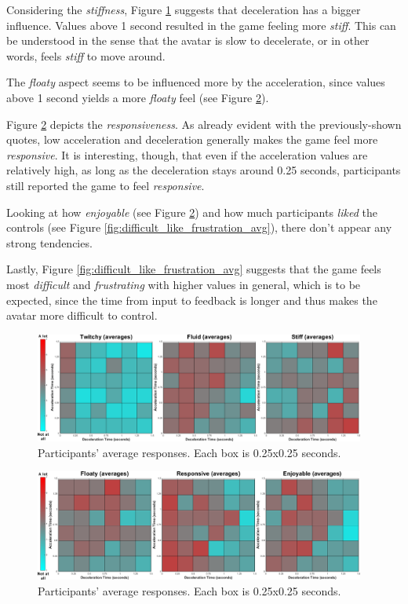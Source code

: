 Considering the \textit{stiffness}, Figure \ref{fig:twitchy_fluid_stiff_avg} suggests that deceleration has a bigger influence. Values above 1 second resulted in the game feeling more \textit{stiff}. This can be understood in the sense that the avatar is slow to decelerate, or in other words, feels \textit{stiff} to move around.

The \textit{floaty} aspect seems to be influenced more by the acceleration, since values above 1 second yields a more \textit{floaty} feel (see Figure \ref{fig:floaty_responsive_enjoyable_avg}).

Figure \ref{fig:floaty_responsive_enjoyable_avg} depicts the \textit{responsiveness}. As already evident with the previously-shown quotes, low acceleration and deceleration generally makes the game feel more \textit{responsive}. It is interesting, though, that even if the acceleration values are relatively high, as long as the deceleration stays around 0.25 seconds, participants still reported the game to feel \textit{responsive}.

Looking at how \textit{enjoyable} (see Figure \ref{fig:floaty_responsive_enjoyable_avg}) and how much participants \textit{liked} the controls (see Figure \ref{fig:difficult_like_frustration_avg}), there don't appear any strong tendencies.

Lastly, Figure \ref{fig:difficult_like_frustration_avg} suggests that the game feels most \textit{difficult} and \textit{frustrating} with higher values in general, which is to be expected, since the time from input to feedback is longer and thus makes the avatar more difficult to control.

\begin{figure}[!htb]
\centering
\includegraphics[width=0.97\textwidth]{Pics/Classes/averages/twitchy_fluid_stiff_avg}
\caption{Participants' average responses. Each box is 0.25x0.25 seconds.}
\label{fig:twitchy_fluid_stiff_avg}
\end{figure}

\begin{figure}[!htb]
\centering
\includegraphics[width=0.97\textwidth]{Pics/Classes/averages/floaty_responsive_enjoyable_avg.png}
\caption{Participants' average responses. Each box is 0.25x0.25 seconds.}
\label{fig:floaty_responsive_enjoyable_avg}
\end{figure}

